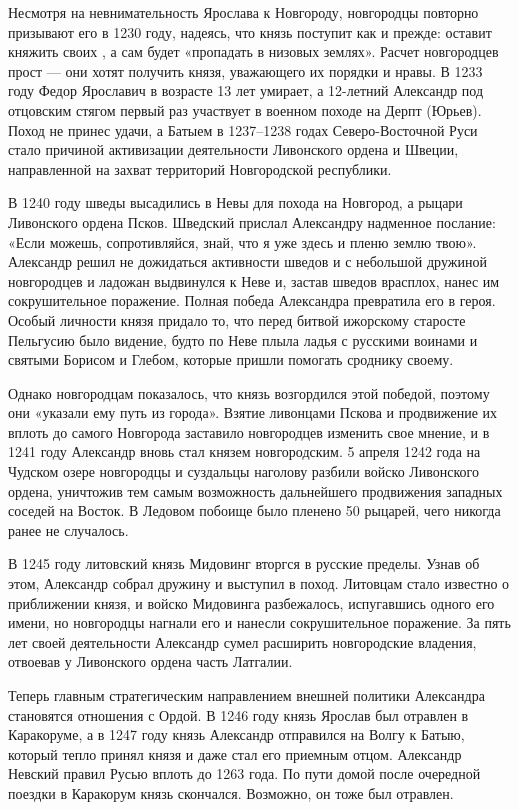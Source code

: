 Несмотря на невнимательность Ярослава к Новгороду, новгородцы повторно призывают его в 1230 году, надеясь, что князь поступит как и прежде: оставит княжить своих , а сам будет «пропадать в низовых землях». Расчет новгородцев прост — они хотят получить князя, уважающего их порядки и нравы. В 1233 году Федор Ярославич в возрасте 13 лет умирает, а 12-летний Александр под отцовским стягом первый раз участвует в военном походе на Дерпт (Юрьев). Поход не принес удачи, а  Батыем в 1237–1238 годах Северо-Восточной Руси стало причиной активизации деятельности Ливонского ордена и Швеции, направленной на захват территорий Новгородской республики.

В 1240 году шведы высадились в  Невы для похода на Новгород, а рыцари Ливонского ордена  Псков. Шведский  прислал Александру надменное послание: «Если можешь, сопротивляйся, знай, что я уже здесь и пленю землю твою». Александр решил не дожидаться активности шведов и с небольшой дружиной новгородцев и ладожан выдвинулся к Неве и, застав шведов врасплох, нанес им сокрушительное поражение. Полная победа Александра превратила его в героя. Особый  личности князя придало то, что перед битвой ижорскому старосте Пельгусию было видение, будто по Неве плыла ладья с русскими воинами и святыми Борисом и Глебом, которые пришли помогать сроднику своему.

Однако новгородцам показалось, что князь возгордился этой победой, поэтому они «указали ему путь из города». Взятие ливонцами Пскова и продвижение их вплоть до самого Новгорода заставило новгородцев изменить свое мнение, и в 1241 году Александр вновь стал князем новгородским.
5 апреля 1242 года на Чудском озере новгородцы и суздальцы наголову разбили войско Ливонского ордена, уничтожив тем самым возможность дальнейшего продвижения западных соседей на Восток. В Ледовом побоище было пленено 50 рыцарей, чего никогда ранее не случалось.

В 1245 году литовский князь Мидовинг вторгся в русские пределы. Узнав об этом, Александр собрал дружину и выступил в поход. Литовцам стало известно о приближении князя, и войско Мидовинга разбежалось, испугавшись одного его имени, но новгородцы нагнали его и нанесли сокрушительное поражение. За пять лет своей деятельности Александр сумел расширить новгородские владения, отвоевав у Ливонского ордена часть Латгалии.

Теперь главным стратегическим направлением внешней политики Александра становятся отношения с Ордой. В 1246 году князь Ярослав был отравлен в Каракоруме, а в 1247 году князь Александр отправился на Волгу к Батыю, который тепло принял князя и даже стал его приемным отцом.
Александр Невский правил Русью вплоть до 1263 года. По пути домой после очередной поездки в Каракорум князь скончался. Возможно, он тоже был отравлен.